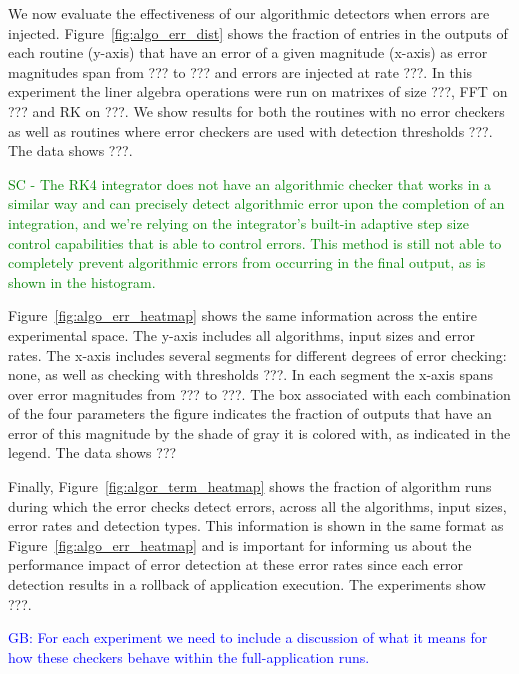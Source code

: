 \documentclass{sig-alternate}
\newcommand{\sui}[1]{%
  \textcolor{green}{SC - #1}
}
\newcommand{\greg}[1]{%
  \textcolor{blue}{GB: #1}
}
\begin{document}
We now evaluate the effectiveness of our algorithmic detectors when errors are injected.
Figure~\ref{fig:algo_err_dist} shows the fraction of entries in the outputs of each routine (y-axis) that have an error of a given magnitude (x-axis) as error magnitudes span from ??? to ??? and errors are injected at rate ???.
In this experiment the liner algebra operations were run on matrixes of size ???, FFT on ??? and RK on ???.
We show results for both the routines with no error checkers as well as routines where error checkers are used with detection thresholds ???.
The data shows ???.

\sui{The RK4 integrator does not have an algorithmic checker that works in a similar way and can precisely detect algorithmic error upon the completion of an integration, and we're relying on the integrator's built-in adaptive step size control capabilities that is able to control errors. This method is still not able to completely prevent algorithmic errors from occurring in the final output, as is shown in the histogram.}

Figure~\ref{fig:algo_err_heatmap} shows the same information across the entire experimental space.
The y-axis includes all algorithms, input sizes and error rates.
The x-axis includes several segments for different degrees of error checking: none, as well as checking with thresholds ???. In each segment the x-axis spans over error magnitudes from ??? to ???.
The box associated with each combination of the four parameters the figure indicates the fraction of outputs that have an error of this magnitude by the shade of gray it is colored with, as indicated in the legend.
The data shows ???


Finally, Figure~\ref{fig:algor_term_heatmap} shows the fraction of algorithm runs during which the error checks detect errors, across all the algorithms, input sizes, error rates and detection types.
This information is shown in the same format as Figure~\ref{fig:algo_err_heatmap} and is important for informing us about the performance impact of error detection at these error rates since each error detection results in a rollback of application execution.
The experiments show ???.

\greg{For each experiment we need to include a discussion of what it means for how these checkers behave within the full-application runs.}
\end{document}
